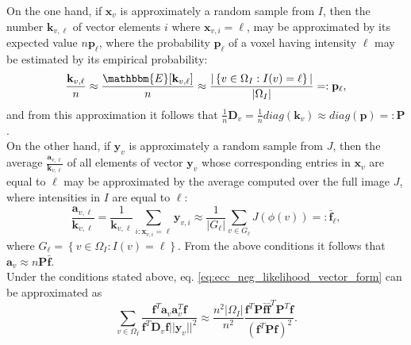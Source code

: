 On the one hand, if $\mathbf{x}_{v}$ is approximately a random sample from $I$, then the number $\mathbf{k}_{v,\ell}$ of vector elements $i$ where $\mathbf{x}_{v,i} = \ell$, may be approximated by its expected value $n\mathbf{p}_{\ell}$, where the probability $\mathbf{p}_{\ell}$ of a voxel having intensity $\ell$ may be estimated by its empirical probability:
\begin{equation}
    \frac{\mathbf{k}_{v, \ell}}{n} \approx \frac{\mathbbm{E}[\mathbf{k}_{v,\ell}]}{n} \approx \frac{|\left\lbrace v\in\Omega_{I} : I(v) = \ell\right\rbrace|}{|\Omega_{I}|} =: \mathbf{p}_{\ell},
\end{equation}
and from this approximation it follows that $\frac{1}{n}\mathbf{D}_{v} = \frac{1}{n}diag(\mathbf{k}_{v}) \approx diag(\mathbf{p}) =: \mathbf{P}$.\\

On the other hand, if $\mathbf{y}_{v}$ is approximately a random sample from $J$, then the average $\frac{\mathbf{a}_{v,\ell}}{\mathbf{k}_{v,\ell}}$ of all elements of vector $\mathbf{y}_{v}$ whose corresponding entries in $\mathbf{x}_{v}$ are equal to $\ell$ may be approximated by the average computed over the full image $J$, where intensities in $I$ are equal to $\ell$:
\begin{equation}\label{eq:average_of_isosets}
    \frac{\mathbf{a}_{v,\ell}}{\mathbf{k}_{v,\ell}} =  \frac{1}{\mathbf{k}_{v,\ell}}\sum_{i:\mathbf{x}_{v,i}=\ell} \mathbf{y}_{v,i} \approx \frac{1}{|G_{\ell}|}\sum_{v\in G_{\ell}} J(\phi(v))
    =:\bar{\mathbf{f}}_{\ell},
\end{equation}
where $G_{\ell} = \left\lbrace v\in \Omega_{I}: I(v) = \ell\right\rbrace$. From the above conditions it follows that $\mathbf{a}_{v} \approx n \mathbf{P} \mathbf{\bar{f}}$.\\

Under the conditions stated above, eq. \eqref{eq:ecc_neg_likelihood_vector_form} can be approximated as
\begin{equation}
    \sum_{v\in\Omega_{I}}\frac{\mathbf{f}^{T}\mathbf{a}_{v}\mathbf{a}_{v}^{T}\mathbf{f}}
    {\mathbf{f}^{T} \mathbf{D}_{v} \mathbf{f}||\mathbf{y}_{v}||^{2}} \approx
    \frac{n^{2}|\Omega_{I}|}{n^{2}}
    \frac{\mathbf{f}^{T}\mathbf{P}\mathbf{\bar{f}}\mathbf{\bar{f}}^{T}\mathbf{P}^{T}\mathbf{f}}{\left(\mathbf{f}^{T} \mathbf{P} \mathbf{f}\right)^{2}}.
\end{equation}

